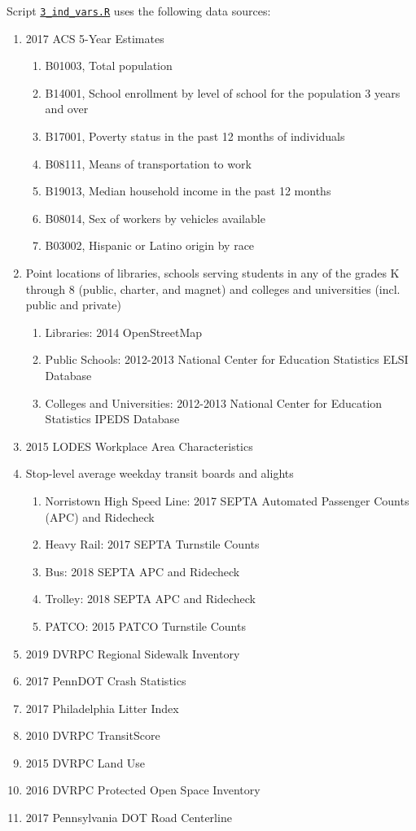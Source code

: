 \documentclass[paper=letterpaper, fontsize=11pt]{scrartcl}
\begin{document}
Script \href{https://github.com/addisonlarson/ped_counts/blob/master/3_ind_vars.R}{\texttt{3\_ind\_vars.R}} uses the following data sources:
\begin{enumerate}[itemsep=-4pt]
	\item 2017 ACS 5-Year Estimates
	\begin{enumerate}[itemsep=-4pt]
		\item B01003, Total population
		\item B14001, School enrollment by level of school for the population 3 years and over
		\item B17001, Poverty status in the past 12 months of individuals
		\item B08111, Means of transportation to work
		\item B19013, Median household income in the past 12 months
		\item B08014, Sex of workers by vehicles available
		\item B03002, Hispanic or Latino origin by race
	\end{enumerate}
	\item Point locations of libraries, schools serving students in any of the grades K through 8 (public, charter, and magnet) and colleges and universities (incl. public and private)
	\begin{enumerate}[itemsep=-4pt]
		\item Libraries: 2014 OpenStreetMap
		\item Public Schools: 2012-2013 National Center for Education Statistics ELSI Database
		\item Colleges and Universities: 2012-2013 National Center for Education Statistics IPEDS Database
	\end{enumerate}
	\item 2015 LODES Workplace Area Characteristics
	\item Stop-level average weekday transit boards and alights
	\begin{enumerate}[itemsep=-4pt]
		\item Norristown High Speed Line: 2017 SEPTA Automated Passenger Counts (APC) and Ridecheck
		\item Heavy Rail: 2017 SEPTA Turnstile Counts
		\item Bus: 2018 SEPTA APC and Ridecheck
		\item Trolley: 2018 SEPTA APC and Ridecheck
		\item PATCO: 2015 PATCO Turnstile Counts
	\end{enumerate}
	\item 2019 DVRPC Regional Sidewalk Inventory
	\item 2017 PennDOT Crash Statistics
	\item 2017 Philadelphia Litter Index
	\item 2010 DVRPC TransitScore
	\item 2015 DVRPC Land Use
	\item 2016 DVRPC Protected Open Space Inventory
	\item 2017 Pennsylvania DOT Road Centerline
\end{enumerate}
\end{document}
